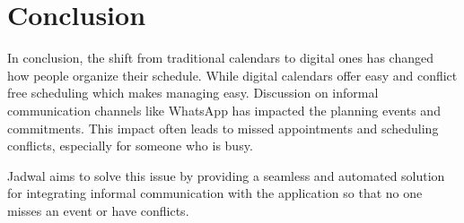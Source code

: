 \section{Conclusion}

In conclusion, the shift from traditional calendars to digital ones has changed how people organize their schedule.
While digital calendars offer easy and conflict free scheduling which makes managing easy.
Discussion on informal communication channels like WhatsApp has impacted the planning events and commitments.
This impact often leads to missed appointments and scheduling conflicts, especially for someone who is busy.

Jadwal aims to solve this issue by providing a seamless and automated solution for integrating informal communication with the application so that no one misses an event or have conflicts.

\cleardoublepage
